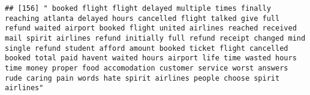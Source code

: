 \documentclass[
]{article}
\begin{document}
\begin{verbatim}
## [156] " booked flight flight delayed multiple times finally reaching atlanta delayed hours cancelled flight talked give full refund waited airport booked flight united airlines reached received mail spirit airlines refund initially full refund receipt changed mind single refund student afford amount booked ticket flight cancelled booked total paid havent waited hours airport life time wasted hours time money proper food accomodation customer service worst answers rude caring pain words hate spirit airlines people choose spirit airlines"                                                                                                                                                                                                                                                                                                                                                                                                                                                                                                                                                                                                                                                                                                                                                                                                                                                                                                                                                                                                                                                                                                                                                                                                                                        

\end{verbatim}
\end{document}
